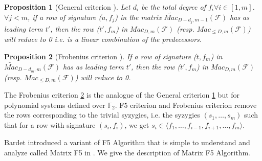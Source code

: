 \documentclass[english]{article}
\newtheorem{proposition}{Proposition}[section]
\newcommand{\Mac}[3]{{Mac_{#1, #2}(\mathcal{#3})}}
\newcommand{\Mact}[3]{{\widetilde{Mac}_{#1, #2}(\mathcal{#3})}}
\begin{document}
		\begin{proposition}[General criterion \cite{F02}]
			\label{F5Crit}
			Let $d_i$ be the total degree of $f_i \forall i \in [1,m]$.
			$\forall j < m$, if a row of signature ($u, f_j$) in the matrix $\Mact{D-d_j}{m-1}{F}$ has as leading term $t'$, then the row ($t', f_m$) in $\Mac{D}{m}{F}$ (resp. $\Mac{\leq D}{m}{F}$) will reduce to 0 i.e. is a linear combination of the predecessors.
		\end{proposition}
		
		\begin{proposition}[Frobenius criterion \cite{F02}]
			\label{Frob}
			If a row of signature ($t, f_m$) in $\Mact{D - d_m}{m}{F}$ has as leading term $t'$, then the row ($t', f_m$) in $\Mac{D}{m}{F}$ (resp. $\Mac{\leq D}{m}{F}$) will reduce to 0.
		\end{proposition}
		
		The Frobenius criterion \ref{Frob} is the analogue of the General criterion \ref{F5Crit} but for polynomial systems defined over $\mathbb{F}_2$.
		F5 criterion and Frobenius criterion remove the rows corresponding to the trivial syzygies, i.e. the syzygies $(s_1, \dots, s_m)$ such that for a row with signature $(s_i, f_i)$, we get $s_i \in \langle f_1,\dots,f_{i-1},f_{i+1},\dots,f_m \rangle$.
		
		Bardet introduced a variant of F5 Algorithm that is simple to understand and analyze called Matrix F5 in \cite{Bardet04}.
		We give the description of Matrix F5 Algorithm.
		
\end{document}
